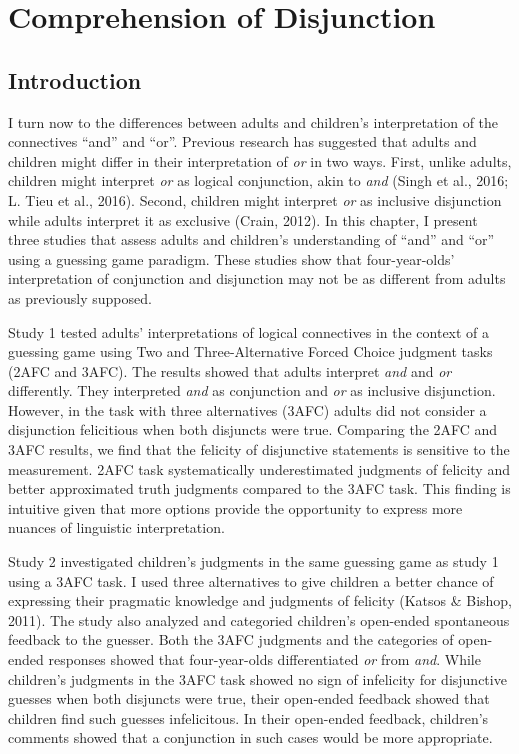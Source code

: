 \documentclass[oneside]{report}
\theoremstyle{definition}
\theoremstyle{definition}
\theoremstyle{definition}
\theoremstyle{remark}
\begin{document}
\chapter{Comprehension of Disjunction}\label{comprehension}

\section{Introduction}\label{introduction-2}

I turn now to the differences between adults and children's
interpretation of the connectives ``and'' and ``or''. Previous research
has suggested that adults and children might differ in their
interpretation of \emph{or} in two ways. First, unlike adults, children
might interpret \emph{or} as logical conjunction, akin to \emph{and}
(Singh et al., 2016; L. Tieu et al., 2016). Second, children might
interpret \emph{or} as inclusive disjunction while adults interpret it
as exclusive (Crain, 2012). In this chapter, I present three studies
that assess adults and children's understanding of ``and'' and ``or''
using a guessing game paradigm. These studies show that four-year-olds'
interpretation of conjunction and disjunction may not be as different
from adults as previously supposed.

Study 1 tested adults' interpretations of logical connectives in the
context of a guessing game using Two and Three-Alternative Forced Choice
judgment tasks (2AFC and 3AFC). The results showed that adults interpret
\emph{and} and \emph{or} differently. They interpreted \emph{and} as
conjunction and \emph{or} as inclusive disjunction. However, in the task
with three alternatives (3AFC) adults did not consider a disjunction
felicitious when both disjuncts were true. Comparing the 2AFC and 3AFC
results, we find that the felicity of disjunctive statements is
sensitive to the measurement. 2AFC task systematically underestimated
judgments of felicity and better approximated truth judgments compared
to the 3AFC task. This finding is intuitive given that more options
provide the opportunity to express more nuances of linguistic
interpretation.

Study 2 investigated children's judgments in the same guessing game as
study 1 using a 3AFC task. I used three alternatives to give children a
better chance of expressing their pragmatic knowledge and judgments of
felicity (Katsos \& Bishop, 2011). The study also analyzed and
categoried children's open-ended spontaneous feedback to the guesser.
Both the 3AFC judgments and the categories of open-ended responses
showed that four-year-olds differentiated \emph{or} from \emph{and}.
While children's judgments in the 3AFC task showed no sign of infelicity
for disjunctive guesses when both disjuncts were true, their open-ended
feedback showed that children find such guesses infelicitous. In their
open-ended feedback, children's comments showed that a conjunction in
such cases would be more appropriate.
\end{document}
